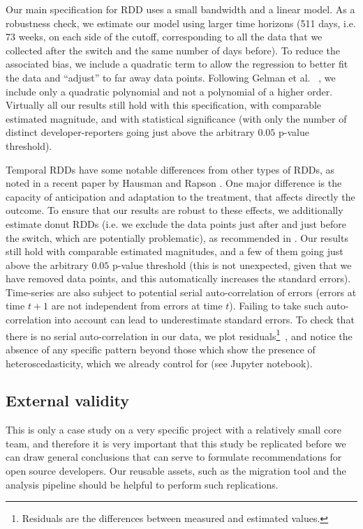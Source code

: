 \documentclass[conference]{IEEEtran}
\begin{document}
Our main specification for RDD uses a small bandwidth and a linear model. As a robustness check, we estimate our model using larger time horizons (511 days, i.e. 73 weeks, on each side of the cutoff, corresponding to all the data that we collected after the switch and the same number of days before). To reduce the associated bias, we include a quadratic term to allow the regression to better fit the data and ``adjust'' to far away data points. Following Gelman et al. ~\cite{gelman2018high}, we include only a quadratic polynomial and not a polynomial of a higher order. Virtually all our results still hold with this specification, with comparable estimated magnitude, and with statistical significance (with only the number of distinct developer-reporters going just above the arbitrary $0.05$ p-value threshold).

Temporal RDDs have some notable differences from other types of RDDs, as noted in a recent paper by Hausman and Rapson \cite{hausman2018regression}. One major difference is the capacity of anticipation and adaptation to the treatment, that affects directly the outcome. To ensure that our results are robust to these effects, we additionally estimate donut RDDs (i.e. we exclude the data points just after and just before the switch, which are potentially problematic), as recommended in \cite{hausman2018regression}. Our results still hold with comparable estimated magnitudes, and a few of them going just above the arbitrary $0.05$ p-value threshold (this is not unexpected, given that we have removed data points, and this automatically increases the standard errors).
Time-series are also subject to potential serial auto-correlation of errors (errors at time $t+1$ are not independent from errors at time $t$). Failing to take such auto-correlation into account can lead to underestimate standard errors. To check that there is no serial auto-correlation in our data, we plot residuals\footnote{Residuals are the differences between measured and estimated values.}~\cite{wagner2002segmented}, and notice the absence of any specific pattern beyond those which show the presence of heteroscedasticity, which we already control for (see Jupyter notebook).

\subsection{External validity}

This is only a case study on a very specific project with a relatively small core team, and therefore it is very important that this study be replicated before we can draw general conclusions that can serve to formulate recommendations for open source developers. Our reusable assets, such as the migration tool and the analysis pipeline should be helpful to perform such replications.
\end{document}
